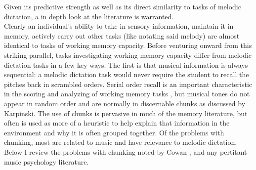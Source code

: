\documentclass[]{book}
\begin{document}
Given its predictive strength as well as its direct similarity to tasks of melodic dictation, a in depth look at the literature is warranted.\\
Clearly an individual's ability to take in sensory information, maintain it in memory, actively carry out other tasks (like notating said melody) are almost identical to tasks of working memory capacity.
Before venturing onward from this striking parallel, tasks investigating working memory capacity differ from melodic dictation tasks in a few key ways.
The first is that musical information is always sequential: a melodic dictation task would never require the student to recall the pitches back in scrambled orders.
Serial order recall is an important characteristic in the scoring and analyzing of working memory tasks \citep{conwayWorkingMemorySpan2005}, but musical tones do not appear in random order and are normally in discernable chunks as discussed by Karpinski\citep{karpinskiAuralSkillsAcquisition2000}.
The use of chunks is pervasive in much of the memory literature, but often is used as more of a heuristic to help explain that information in the environment and why it is often grouped together.
Of the problems with chunking, most are related to music and have relevance to melodic dictation.
Below I review the problems with chunking noted by Cowan \citep{cowanWorkingMemoryCapacity2005}, and any pertitant music psychology literature.
\end{document}
